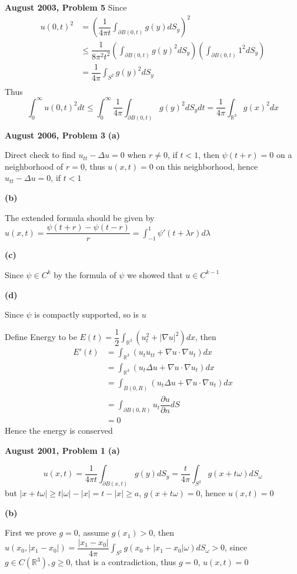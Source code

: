 \documentclass[../main.tex]{subfiles}
\begin{document}
\begin{customproblem}\textbf{August 2003, Problem 5}
Since
\[
\begin{aligned}
u(0,t)^2
&=\left( \dfrac{1}{4\pi t}\int_{\partial B(0,t)}g(y)dS_y \right)^2 \\
&\leq \dfrac{1}{8\pi^2t^2}\left(\int_{\partial B(0,t)}g(y)^2dS_y\right)\left(\int_{\partial B(0,t)}1^2dS_y\right) \\
&=\dfrac{1}{4\pi}\int_{S^2}g(y)^2dS_y \\
\end{aligned}
\]
Thus
\[
\int_0^\infty u(0,t)^2dt\leq \int_0^\infty\dfrac{1}{4\pi}\int_{\partial B(0,t)}g(y)^2dS_ydt=\dfrac{1}{4\pi}\int_{\mathbb{R}^3}g(x)^2dx
\]
\end{customproblem}

\begin{customproblem}\textbf{August 2006, Problem 3}
\textbf{(a)} \par
Direct check to find $u_{tt}-\Delta u=0$ when $r\neq 0$, if $t<1$, then $\psi(t+r)=0$ on a neighborhood of $r=0$, thus $u(x,t)=0$ on this neighborhood, hence $u_{tt}-\Delta u=0$, if $t<1$ \par
\textbf{(b)} \par
The extended formula should be given by $\displaystyle u(x,t)=\dfrac{\psi(t+r)-\psi(t-r)}{r}=\int_{-1}^1\psi'(t+\lambda r)d\lambda $ \par
\textbf{(c)} \par
Since $\psi\in C^k$ by the formula of $\psi$ we showed that $u\in C^{k-1}$ \par
\textbf{(d)} \par
Since $\psi$ is compactly supported, so is $u$ \par
Define Energy to be $\displaystyle E(t)=\dfrac{1}{2}\int_{\mathbb{R}^3}\left(u_t^2+|\nabla u|^2\right)dx$, then 
\[
\begin{aligned}
E'(t)
&=\int_{\mathbb{R}^3}\left(u_tu_{tt}+\nabla u\cdot\nabla u_t\right)dx \\
&=\int_{\mathbb{R}^3}\left(u_t\Delta u+\nabla u\cdot\nabla u_t\right)dx \\
&=\int_{B(0,R)}\left(u_t\Delta u+\nabla u\cdot\nabla u_t\right)dx \\
&=\int_{\partial B(0,R)}u_t\dfrac{\partial u}{\partial n}dS \\
&=0
\end{aligned}
\]
Hence the energy is conserved
\end{customproblem}

\begin{customproblem}\textbf{August 2001, Problem 1}
\textbf{(a)} \par
$$ u(x,t)=\dfrac{1}{4\pi t}\int_{\partial B(x,t)}g(y)dS_y=\dfrac{t}{4\pi}\int_{S^2}g(x+t\omega)dS_\omega $$
but $|x+t\omega|\geq t|\omega|-|x|=t-|x|\geq a$, $g(x+t\omega)=0$, hence $u(x,t)=0$ \par
\textbf{(b)} \par
First we prove $g=0$, assume $g(x_1)>0$, then $\displaystyle u(x_0,|x_1-x_0|)=\dfrac{|x_1-x_0|}{4\pi}\int_{S^2}g(x_0+|x_1-x_0|\omega)dS_\omega >0$, since $g\in C(\mathbb{R}^3), g\geq 0$, that is a contradiction, thus $g=0$, $u(x,t)=0$
\end{customproblem}
\end{document}
